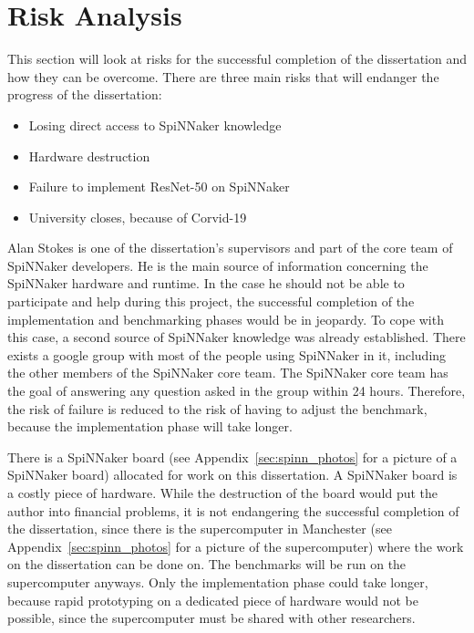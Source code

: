 \documentclass{article}
\begin{document}

\section{Risk Analysis} %
\label{sec:risk_analysis}

This section will look at risks for the successful
completion of the dissertation and how they can be
overcome.
There are three main risks that will endanger the progress
of the dissertation:
\begin{itemize}
  \item Losing direct access to SpiNNaker knowledge
  \item Hardware destruction
  \item Failure to implement ResNet-50 on SpiNNaker
  \item University closes, because of Corvid-19
\end{itemize}

Alan Stokes is one of the dissertation's supervisors and part
of the core team of SpiNNaker developers.
He is the main source of information concerning the
SpiNNaker hardware and runtime.
In the case he should not be able to participate and help
during this project, the successful completion of the implementation
and benchmarking phases would be in jeopardy.
To cope with this case, a second source of SpiNNaker knowledge was
already established.
There exists a google group with most of the people using SpiNNaker in
it, including the other members of the SpiNNaker core team.
The SpiNNaker core team has the goal of answering any question asked
in the group within 24 hours.
Therefore, the risk of failure is reduced to the risk of having to
adjust the benchmark, because the implementation phase will take
longer.

There is a SpiNNaker board (see
Appendix~\ref{sec:spinn_photos} for a picture of a
SpiNNaker board) allocated for work on this dissertation.
A SpiNNaker board is a costly piece of hardware.
While the destruction of the board would put the author
into financial problems, it is not endangering the
successful completion of the dissertation, since there is
the supercomputer in Manchester (see
Appendix~\ref{sec:spinn_photos} for a picture of the
supercomputer) where the work on the dissertation can be
done on.
The benchmarks will be run on the supercomputer anyways.
Only the implementation phase could take longer, because
rapid prototyping on a dedicated piece of hardware would
not be possible, since the supercomputer must be shared
with other researchers.
\end{document}
